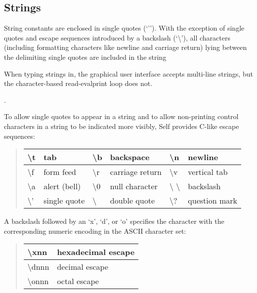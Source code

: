 \documentclass[letterpaper,10pt,english]{sphinxmanual}
\begin{document}

\subsection{Strings}
\label{\detokenize{langref:strings}}\label{\detokenize{langref:index-68}}
String constants are enclosed in single quotes (‘’’). With the exception of single quotes and escape
sequences introduced by a backslash (‘\textbackslash{}’), all characters (including formatting characters like
newline and carriage return) lying between the delimiting single quotes are included in the string %
\begin{footnote}[12]\sphinxAtStartFootnote
When typing strings in, the graphical user interface accepts multi-line strings, but the character-based read-evalprint loop does not.
%
\end{footnote}.

To allow single quotes to appear in a string and to allow non-printing control characters in a string
to be indicated more visibly, Self provides C-like escape sequences:
\begin{quote}

\noindent\begin{tabulary}{\linewidth}{|L|L|L|L|L|L|}
\hline

\textbackslash{}t
&
tab
&
\textbackslash{}b
&
backspace
&
\textbackslash{}n
&
newline
\\
\hline
\textbackslash{}f
&
form feed
&
\textbackslash{}r
&
carriage return
&
\textbackslash{}v
&
vertical tab
\\
\hline
\textbackslash{}a
&
alert (bell)
&
\textbackslash{}0
&
null character
&
\textbackslash{} \textbackslash{}
&
backslash
\\
\hline
\textbackslash{}’
&
single quote
&
\textbackslash{}\sphinxquotedblright{}
&
double quote
&
\textbackslash{}?
&
question mark
\\
\hline\end{tabulary}

\end{quote}

A backslash followed by an ‘x’, ‘d’, or ‘o’ specifies the character with the corresponding numeric
encoding in the ASCII character set:
\begin{quote}

\noindent\begin{tabulary}{\linewidth}{|L|L|}
\hline

\textbackslash{}xnn
&
hexadecimal escape
\\
\hline
\textbackslash{}dnnn
&
decimal escape
\\
\hline
\textbackslash{}onnn
&
octal escape
\\
\hline\end{tabulary}

\end{quote}
\end{document}
